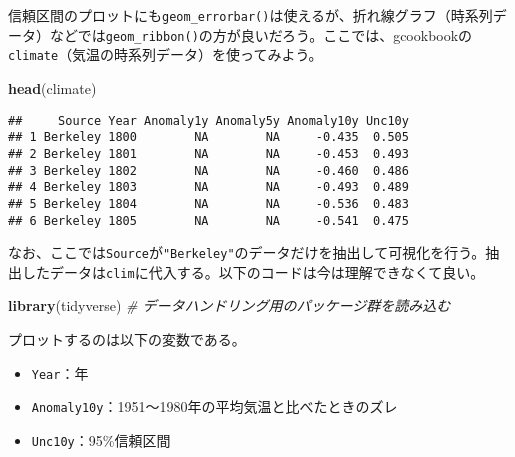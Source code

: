 \documentclass[]{book}
\newenvironment{Shaded}{\begin{snugshade}}{\end{snugshade}}
\newcommand{\KeywordTok}[1]{\textcolor[rgb]{0.13,0.29,0.53}{\textbf{#1}}}
\newcommand{\StringTok}[1]{\textcolor[rgb]{0.31,0.60,0.02}{#1}}
\newcommand{\CommentTok}[1]{\textcolor[rgb]{0.56,0.35,0.01}{\textit{#1}}}
\newcommand{\OperatorTok}[1]{\textcolor[rgb]{0.81,0.36,0.00}{\textbf{#1}}}
\newcommand{\NormalTok}[1]{#1}
\begin{document}
信頼区間のプロットにも\texttt{geom\_errorbar()}は使えるが、折れ線グラフ（時系列データ）などでは\texttt{geom\_ribbon()}の方が良いだろう。ここでは、gcookbookの\texttt{climate}（気温の時系列データ）を使ってみよう。

\begin{Shaded}
\begin{Highlighting}[]
\KeywordTok{head}\NormalTok{(climate)}
\end{Highlighting}
\end{Shaded}

\begin{verbatim}
##     Source Year Anomaly1y Anomaly5y Anomaly10y Unc10y
## 1 Berkeley 1800        NA        NA     -0.435  0.505
## 2 Berkeley 1801        NA        NA     -0.453  0.493
## 3 Berkeley 1802        NA        NA     -0.460  0.486
## 4 Berkeley 1803        NA        NA     -0.493  0.489
## 5 Berkeley 1804        NA        NA     -0.536  0.483
## 6 Berkeley 1805        NA        NA     -0.541  0.475
\end{verbatim}

なお、ここでは\texttt{Source}が\texttt{"Berkeley"}のデータだけを抽出して可視化を行う。抽出したデータは\texttt{clim}に代入する。以下のコードは今は理解できなくて良い。

\begin{Shaded}
\begin{Highlighting}[]
\KeywordTok{library}\NormalTok{(tidyverse) }\CommentTok{# データハンドリング用のパッケージ群を読み込む}
\end{Highlighting}
\end{Shaded}

\begin{Shaded}
\end{Shaded}

プロットするのは以下の変数である。

\begin{itemize}
\item
  \texttt{Year}：年
\item
  \texttt{Anomaly10y}：1951〜1980年の平均気温と比べたときのズレ
\item
  \texttt{Unc10y}：95\%信頼区間
\end{itemize}
\end{document}
